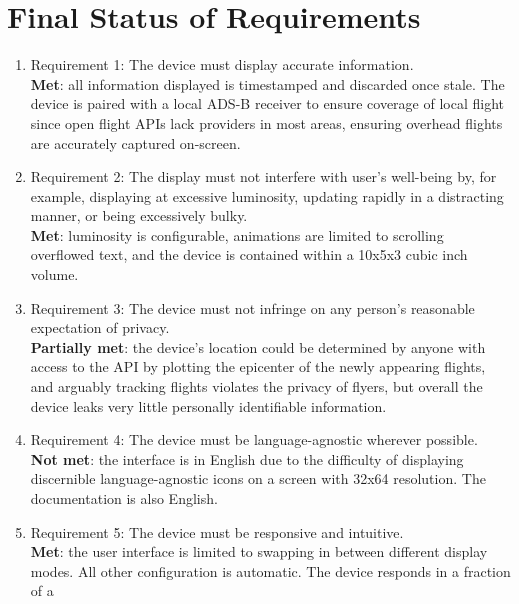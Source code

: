 \clearpage
\section{Final Status of Requirements}
\begin{enumerate}
      \item Requirement 1: The device must display accurate information.\\
            \textbf{Met}: all information displayed is timestamped and
            discarded once stale. The device is paired with a local
            ADS-B receiver to ensure coverage of local flight since
            open flight APIs lack providers in most areas, ensuring
            overhead flights are accurately captured on-screen.
      \item Requirement 2: The display must not interfere with
            user's well-being by, for example, displaying at
            excessive luminosity, updating rapidly
            in a distracting manner, or being
            excessively bulky. \\
            \textbf{Met}: luminosity is configurable, animations are
            limited to scrolling overflowed text, and the device is
            contained within a 10x5x3 cubic inch volume.
      \item Requirement 3: The device must not infringe on any person's
            reasonable expectation of privacy. \\
            \textbf{Partially met}: the device's location could be
            determined by anyone with access to the API by plotting
            the epicenter of the newly appearing flights, and
            arguably tracking flights violates the privacy of flyers,
            but overall the device leaks very little personally
            identifiable information.
      \item Requirement 4: The device must be language-agnostic wherever possible. \\
            \textbf{Not met}: the interface is
            in English due to the difficulty of displaying
            discernible language-agnostic icons on a screen with
            32x64 resolution. The documentation is also English.
      \item Requirement 5: The device must be responsive and intuitive. \\
            \textbf{Met}: the user interface is limited to swapping
            in between different display modes. All other configuration
            is automatic. The device responds in a fraction of a

\end{enumerate}
